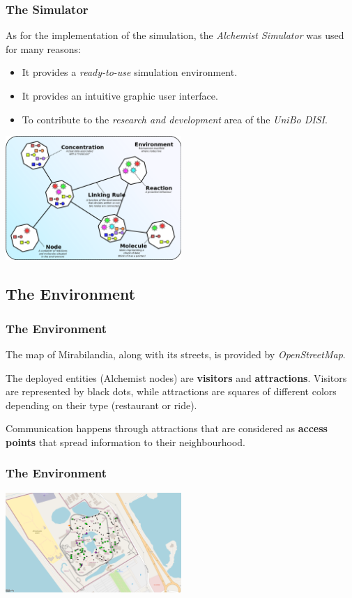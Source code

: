 \begin{frame}
    \frametitle{The Simulator}
    As for the implementation of the simulation, the \textit{Alchemist Simulator} was used for many reasons:
    \begin{itemize}
        \item It provides a \textit{ready-to-use} simulation environment.
        \item It provides an intuitive graphic user interface.
        \item To contribute to the \textit{research and development} area of the \textit{UniBo DISI}.
    \end{itemize}

    \bigskip

    \begin{center}
        \includegraphics[width=0.5\textwidth]{../img/model}
        \label{fig:model}
    \end{center}

\end{frame}

\subsection{The Environment}\label{subsec:the-environment}

\begin{frame}
    \frametitle{The Environment}
    The map of Mirabilandia, along with its streets, is provided by \textit{OpenStreetMap}.

    \bigskip

    The deployed entities (Alchemist nodes) are \textbf{visitors} and \textbf{attractions}.
    Visitors are represented by black dots, while attractions are squares of different colors depending on their type (restaurant or ride).

    \bigskip

    Communication happens through attractions that are considered as \textbf{access points} that spread information to their neighbourhood.

\end{frame}

\begin{frame}
    \frametitle{The Environment}

    \begin{center}
        \includegraphics[width=0.5\textwidth]{../img/simulation-screenshot}
        \label{fig:simulation-screenshot}
    \end{center}

\end{frame}
